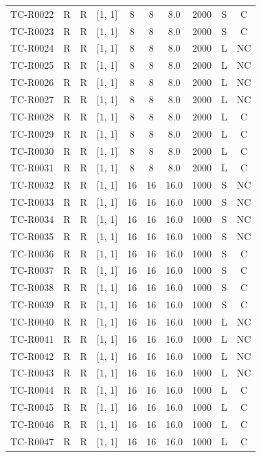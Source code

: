 \begin{longtable}{lccccccccc}
TC-R0022 & R & R & [1, 1] & 8 & 8 & 8.0 & 2000 & S & C \\
TC-R0023 & R & R & [1, 1] & 8 & 8 & 8.0 & 2000 & S & C \\
TC-R0024 & R & R & [1, 1] & 8 & 8 & 8.0 & 2000 & L & NC \\
TC-R0025 & R & R & [1, 1] & 8 & 8 & 8.0 & 2000 & L & NC \\
TC-R0026 & R & R & [1, 1] & 8 & 8 & 8.0 & 2000 & L & NC \\
TC-R0027 & R & R & [1, 1] & 8 & 8 & 8.0 & 2000 & L & NC \\
TC-R0028 & R & R & [1, 1] & 8 & 8 & 8.0 & 2000 & L & C \\
TC-R0029 & R & R & [1, 1] & 8 & 8 & 8.0 & 2000 & L & C \\
TC-R0030 & R & R & [1, 1] & 8 & 8 & 8.0 & 2000 & L & C \\
TC-R0031 & R & R & [1, 1] & 8 & 8 & 8.0 & 2000 & L & C \\
TC-R0032 & R & R & [1, 1] & 16 & 16 & 16.0 & 1000 & S & NC \\
TC-R0033 & R & R & [1, 1] & 16 & 16 & 16.0 & 1000 & S & NC \\
TC-R0034 & R & R & [1, 1] & 16 & 16 & 16.0 & 1000 & S & NC \\
TC-R0035 & R & R & [1, 1] & 16 & 16 & 16.0 & 1000 & S & NC \\
TC-R0036 & R & R & [1, 1] & 16 & 16 & 16.0 & 1000 & S & C \\
TC-R0037 & R & R & [1, 1] & 16 & 16 & 16.0 & 1000 & S & C \\
TC-R0038 & R & R & [1, 1] & 16 & 16 & 16.0 & 1000 & S & C \\
TC-R0039 & R & R & [1, 1] & 16 & 16 & 16.0 & 1000 & S & C \\
TC-R0040 & R & R & [1, 1] & 16 & 16 & 16.0 & 1000 & L & NC \\
TC-R0041 & R & R & [1, 1] & 16 & 16 & 16.0 & 1000 & L & NC \\
TC-R0042 & R & R & [1, 1] & 16 & 16 & 16.0 & 1000 & L & NC \\
TC-R0043 & R & R & [1, 1] & 16 & 16 & 16.0 & 1000 & L & NC \\
TC-R0044 & R & R & [1, 1] & 16 & 16 & 16.0 & 1000 & L & C \\
TC-R0045 & R & R & [1, 1] & 16 & 16 & 16.0 & 1000 & L & C \\
TC-R0046 & R & R & [1, 1] & 16 & 16 & 16.0 & 1000 & L & C \\
TC-R0047 & R & R & [1, 1] & 16 & 16 & 16.0 & 1000 & L & C \\

\end{longtable}
